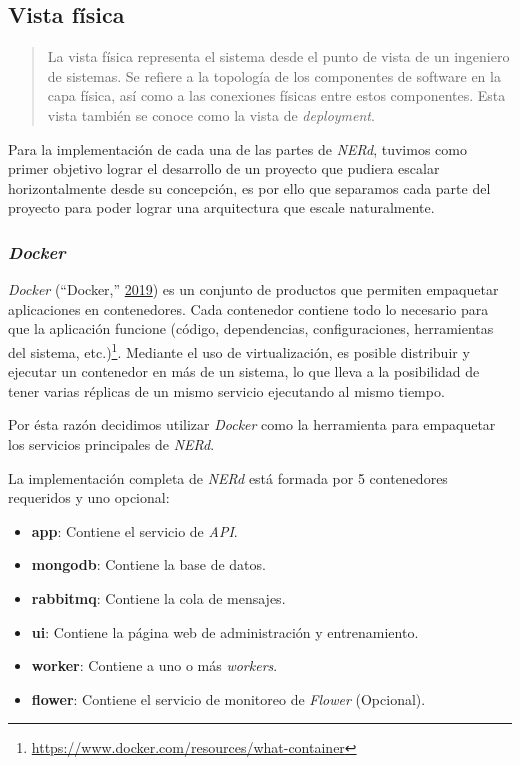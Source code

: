 \documentclass[12pt,a4paper,]{scrartcl}
\providecommand{\tightlist}{%
  \setlength{\itemsep}{0pt}\setlength{\parskip}{0pt}}
\let\rmarkdownfootnote\footnote%
\def\footnote{\protect\rmarkdownfootnote}
\begin{document}
\hypertarget{vista-fuxedsica}{%
\subsection{Vista física}\label{vista-fuxedsica}}

\begin{quote}
La vista física representa el sistema desde el punto de vista de un ingeniero de sistemas.
Se refiere a la topología de los componentes de software en la capa física, así como a las conexiones físicas entre estos componentes.
Esta vista también se conoce como la vista de \emph{deployment}.
\end{quote}

Para la implementación de cada una de las partes de \emph{NERd}, tuvimos como primer objetivo lograr el desarrollo de un proyecto que pudiera escalar horizontalmente desde su concepción, es por ello que separamos cada parte del proyecto para poder lograr una arquitectura que escale naturalmente.

\hypertarget{docker}{%
\subsubsection{\texorpdfstring{\emph{Docker}}{Docker}}\label{docker}}

\emph{Docker} (``Docker,'' \protect\hyperlink{ref-docker}{2019}) es un conjunto de productos que permiten empaquetar aplicaciones en contenedores. Cada contenedor contiene todo lo necesario para que la aplicación funcione (código, dependencias, configuraciones, herramientas del sistema, etc.)\footnote{\url{https://www.docker.com/resources/what-container}}. Mediante el uso de virtualización, es posible distribuir y ejecutar un contenedor en más de un sistema, lo que lleva a la posibilidad de tener varias réplicas de un mismo servicio ejecutando al mismo tiempo.

Por ésta razón decidimos utilizar \emph{Docker} como la herramienta para empaquetar los servicios principales de \emph{NERd}.

La implementación completa de \emph{NERd} está formada por 5 contenedores requeridos y uno opcional:

\begin{itemize}
\tightlist
\item
  \textbf{app}: Contiene el servicio de \emph{API}.
\item
  \textbf{mongodb}: Contiene la base de datos.
\item
  \textbf{rabbitmq}: Contiene la cola de mensajes.
\item
  \textbf{ui}: Contiene la página web de administración y entrenamiento.
\item
  \textbf{worker}: Contiene a uno o más \emph{workers}.
\item
  \textbf{flower}: Contiene el servicio de monitoreo de \emph{Flower} (Opcional).
\end{itemize}
\end{document}
